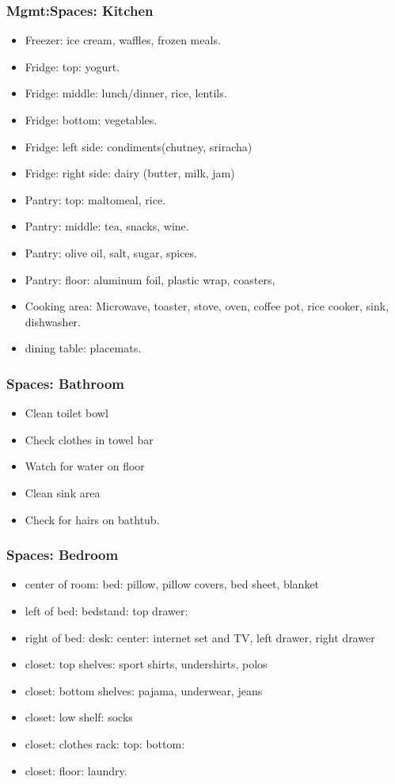\begin{frame}[label=kitchen]
\frametitle{Mgmt:Spaces: Kitchen} 
\begin{itemize}
\small \item \small Freezer: ice cream, waffles, frozen meals.
\item \small Fridge: top: yogurt.
\item \small Fridge: middle: lunch/dinner, rice, lentils. 
\item \small Fridge: bottom: vegetables. 
\item \small Fridge: left side: condiments(chutney, sriracha)
\item \small Fridge: right side: dairy (butter, milk, jam) 
\item \small Pantry: top: maltomeal, rice.
\item \small Pantry: middle: tea, snacks, wine.
\item \small Pantry: olive oil, salt, sugar, spices. 
\item \small Pantry: floor: aluminum foil, plastic wrap, coasters, 
\item \small Cooking area: Microwave, toaster, stove, oven, coffee
  pot, rice cooker, sink, dishwasher.
\item \small dining table: placemats. 
\end{itemize}
\end{frame}

\begin{frame} 
\frametitle{Spaces: Bathroom}
\begin{itemize} 
\tiny \item \tiny Clean toilet bowl
\item \tiny Check clothes in towel bar
\item \tiny Watch for water on floor 
\item \tiny Clean sink area 
\item \tiny Check for hairs on bathtub. 
\end{itemize}
\end{frame}

\begin{frame}
\frametitle{Spaces: Bedroom}
\begin{itemize} 
\tiny \item \tiny center of room: bed: pillow, pillow covers, bed
sheet, blanket
\item \tiny left of bed: bedstand: top drawer:
\item \tiny right of bed:  desk: center: internet set and TV, left drawer, right drawer \\
\tiny \item closet: top shelves: sport shirts, undershirts, polos 
\item \tiny closet: bottom shelves: pajama, underwear, jeans
\item \tiny closet: low shelf: socks
\item \tiny closet: clothes rack: top: bottom: 
\item \tiny closet: floor: laundry. 
\end{itemize} 
\end{frame} 

